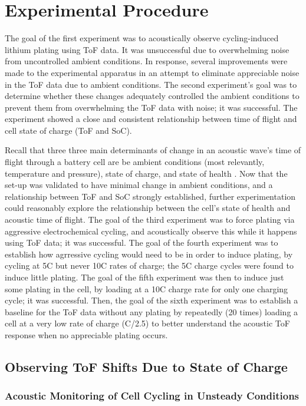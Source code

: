 \chapter{Experimental Procedure}
The goal of the first experiment was to acoustically observe cycling-induced lithium plating using ToF data. It was unsuccessful due to overwhelming noise from uncontrolled ambient conditions. In response, several improvements were made to the experimental apparatus in an attempt to eliminate appreciable noise in the ToF data due to ambient conditions. The second experiment's goal was to determine whether these changes adequately controlled the ambient conditions to prevent them from overwhelming the ToF data with noise; it was successful. The experiment showed a close and consistent relationship between time of flight and cell state of charge (ToF and SoC).

Recall that three three main determinants of change in an acoustic wave's time of flight through a battery cell are be ambient conditions (most relevantly, temperature and pressure), state of charge, and state of health . Now that the set-up was validated to have minimal change in ambient conditions, and a relationship between ToF and SoC strongly established, further experimentation could reasonably explore the relationship between the cell's state of health and acoustic time of flight. The goal of the third experiment was to force plating via aggressive electrochemical cycling, and acoustically observe this while it happens using ToF data; it was successful. The goal of the fourth experiment was to establish how agrressive cycling would need to be in order to induce plating, by cycling at 5C but never 10C rates of charge; the 5C charge cycles were found to induce little plating. The goal of the fifth experiment was then to induce just some plating in the cell, by loading at a 10C charge rate for only one charging cycle; it was successful. Then, the goal of the sixth experiment was to establish a baseline for the ToF data without any plating by repeatedly (20 times) loading a cell at a very low rate of charge (C/2.5) to better understand the acoustic ToF response when no appreciable plating occurs.

\section{Observing ToF Shifts Due to State of Charge}

\subsection{Acoustic Monitoring of Cell Cycling in Unsteady Conditions}

